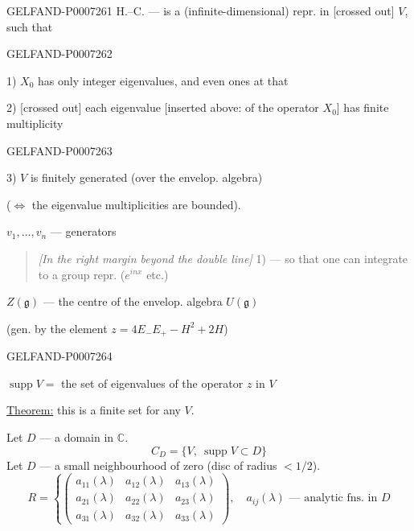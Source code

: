 \begin{GelfandAdjacentEvidence}{GELFAND-P000726}{1}
 H.--C. --- is a (infinite-dimensional) repr. in [crossed out] \(V\), such that
\end{GelfandAdjacentEvidence}
\begin{GelfandAdjacentEvidence}{GELFAND-P000726}{2}


1) \(X_0\) has only integer eigenvalues, and even ones at that

2) [crossed out] each eigenvalue [inserted above: of the operator \(X_0\)] has finite multiplicity
\end{GelfandAdjacentEvidence}
\begin{GelfandAdjacentEvidence}{GELFAND-P000726}{3}


3) \(V\) is finitely generated (over the envelop. algebra)

(\(\Leftrightarrow\) the eigenvalue multiplicities are bounded).

\(v_1,\ldots,v_n\) --- generators

\begin{quote}
\small \textit{[In the right margin beyond the double line]} 1) --- so that one can integrate to a group repr. (\(e^{inx}\) etc.)
\end{quote}

\quad \(Z(\mathfrak g)\) --- the centre of the envelop. algebra \(U(\mathfrak g)\)

(gen. by the element \(z=4E_-E_+-H^2+2H\))
\end{GelfandAdjacentEvidence}
\begin{GelfandAdjacentEvidence}{GELFAND-P000726}{4}


\(\operatorname{supp} V={}\) the set of eigenvalues of the operator \(z\) in \(V\)

\underline{Theorem:} this is a finite set for any \(V\).

 Let \(D\) --- a domain in \(\mathbb C\).
\[
C_D=\{V,\ \operatorname{supp}V\subset D\}
\]
Let \(D\) --- a small neighbourhood of zero (disc of radius \(<1/2\)).
\[
R=\left\{\begin{pmatrix}
a_{11}(\lambda)&a_{12}(\lambda)&a_{13}(\lambda)\\
a_{21}(\lambda)&a_{22}(\lambda)&a_{23}(\lambda)\\
a_{31}(\lambda)&a_{32}(\lambda)&a_{33}(\lambda)
\end{pmatrix}\right.,\quad a_{ij}(\lambda)\text{ --- analytic fns. in }D
\]
\end{GelfandAdjacentEvidence}
